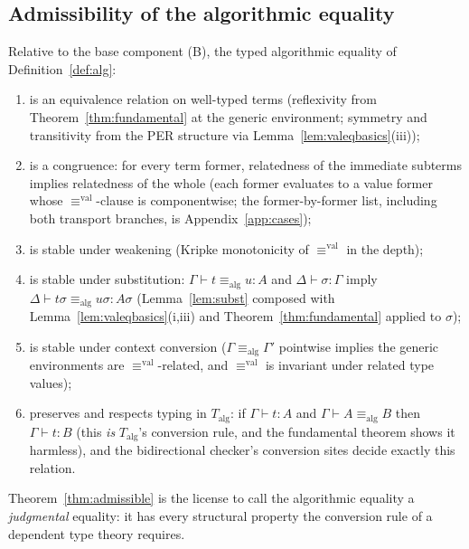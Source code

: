 \documentclass{lmcs}
\newcommand{\aconv}{\equiv_{\mathrm{alg}}}
\newcommand{\valeq}{\equiv^{\mathrm{val}}}
\begin{document}
\subsection{Admissibility of the algorithmic equality}

\begin{thm}\label{thm:admissible}
  Relative to the base component (B), the typed algorithmic equality
  of Definition~\ref{def:alg}:
  \begin{enumerate}
  \item is an equivalence relation on well-typed terms
    (reflexivity from Theorem~\ref{thm:fundamental} at the generic
    environment; symmetry and transitivity from the PER structure via
    Lemma~\ref{lem:valeqbasics}(iii));
  \item is a congruence: for every term former, relatedness of the
    immediate subterms implies relatedness of the whole (each former
    evaluates to a value former whose $\valeq$-clause is
    componentwise; the former-by-former list, including both
    transport branches, is Appendix~\ref{app:cases});
  \item is stable under weakening (Kripke monotonicity of $\valeq$
    in the depth);
  \item is stable under substitution: $\Gamma \vdash t \aconv u : A$
    and $\Delta \vdash \sigma : \Gamma$ imply
    $\Delta \vdash t\sigma \aconv u\sigma : A\sigma$
    (Lemma~\ref{lem:subst} composed with
    Lemma~\ref{lem:valeqbasics}(i,iii) and
    Theorem~\ref{thm:fundamental} applied to $\sigma$);
  \item is stable under context conversion ($\Gamma \aconv \Gamma'$
    pointwise implies the generic environments are $\valeq$-related,
    and $\valeq$ is invariant under related type values);
  \item preserves and respects typing in $T_{\mathrm{alg}}$: if
    $\Gamma \vdash t : A$ and $\Gamma \vdash A \aconv B$ then
    $\Gamma \vdash t : B$ (this \emph{is} $T_{\mathrm{alg}}$'s
    conversion rule, and the fundamental theorem shows it harmless),
    and the bidirectional checker's conversion sites decide exactly
    this relation.
  \end{enumerate}
\end{thm}

\noindent Theorem~\ref{thm:admissible} is the license to call the
algorithmic equality a \emph{judgmental} equality: it has every
structural property the conversion rule of a dependent type theory
requires.
\end{document}
